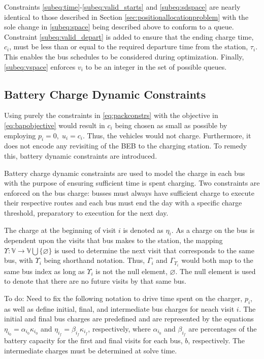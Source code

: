 \documentclass[utf8]{FrontiersinHarvard}
\newcommand{\TODO}[1]{{\color{green} To do: #1}}                                %
\begin{document}
Constraints \eqref{subeq:time}-\eqref{subeq:valid_starts} and \eqref{subeq:sdspace} are nearly identical to those
described in Section \ref{sec:positionallocationproblem} with the sole change in \eqref{subeq:space} being described
above to conform to a queue. Constraint \eqref{subeq:valid_depart} is added to ensure that the ending charge time,
$c_i$, must be less than or equal to the required departure time from the station, $\tau_i$. This enables the bus schedules
to be considered during optimization. Finally, \eqref{subeq:vspace} enforces $v_i$ to be an integer in the set of
possible queues.

\subsection{Battery Charge Dynamic Constraints}
\label{sec:batt_dynamics}
Using purely the constraints in \eqref{eq:packconstrs} with the objective in \eqref{eq:bapobjective} would result in
$c_i$ being chosen as small as possible by employing $p_i = 0,\; u_i = c_i$. Thus, the vehicles would not charge.
Furthermore, it does not encode any revisiting of the BEB to the charging station. To remedy this, battery dynamic
constraints are introduced.

Battery charge dynamic constraints are used to model the charge in each bus with the purpose of ensuring sufficient time
is spent charging. Two constraints are enforced on the bus charge: busses must always have sufficient charge to execute
their respective routes and each bus must end the day with a specific charge threshold, preparatory to execution for the
next day.

The charge at the beginning of visit $i$ is denoted as $\eta_i$. As a charge on the bus is dependent upon the visits that
bus makes to the station, the mapping $\Upsilon: \mathbb{V} \rightarrow \mathbb{V} \bigcup \{\varnothing\}$ is used to determine the next visit
that corresponds to the same bus, with $\Upsilon_i$ being shorthand notation. Thus, $\Gamma_i$ and $\Gamma_{\Upsilon_i}$ would both map to the
same bus index as long as $\Upsilon_i$ is not the null element, $\varnothing$. The null element is used to denote that there
are no future visits by that same bus.

\TODO{Need to fix the following notation} to drive time spent on the charger, $p_i$, as well as define initial, final,
and intermediate bus charges for neach visit $i$. The initial and final bus charges are predefined and are represented
by the equations $\eta_{i_0} = \alpha_{i_0} \kappa_{i_0}$ and $\eta_{i_f} = \beta_{i_f} \kappa_{i_f}$, respectively, where $\alpha_{i_0}$ and
$\beta_{i_f}$ are percentages of the battery capacity for the first and final visits for each bus, $b$, respectively. The
intermediate charges must be determined at solve time.
\end{document}
